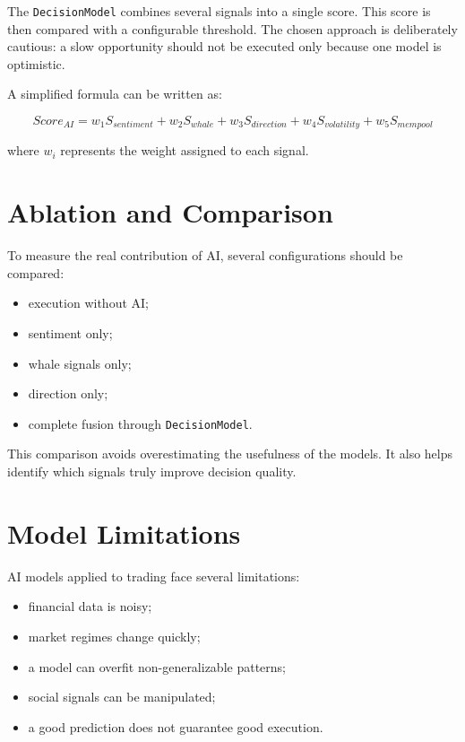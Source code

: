 \documentclass[12pt,a4paper]{report}
\begin{document}
The \texttt{DecisionModel} combines several signals into a single score. This score is then compared with a configurable threshold. The chosen approach is deliberately cautious: a slow opportunity should not be executed only because one model is optimistic.

A simplified formula can be written as:

\begin{equation}
    Score_{AI} = w_1 S_{sentiment} + w_2 S_{whale} + w_3 S_{direction} + w_4 S_{volatility} + w_5 S_{mempool}
\end{equation}

where $w_i$ represents the weight assigned to each signal.

\section{Ablation and Comparison}

To measure the real contribution of AI, several configurations should be compared:
\begin{itemize}
    \item execution without AI;
    \item sentiment only;
    \item whale signals only;
    \item direction only;
    \item complete fusion through \texttt{DecisionModel}.
\end{itemize}

This comparison avoids overestimating the usefulness of the models. It also helps identify which signals truly improve decision quality.

\section{Model Limitations}

AI models applied to trading face several limitations:
\begin{itemize}
    \item financial data is noisy;
    \item market regimes change quickly;
    \item a model can overfit non-generalizable patterns;
    \item social signals can be manipulated;
    \item a good prediction does not guarantee good execution.
\end{itemize}
\end{document}
